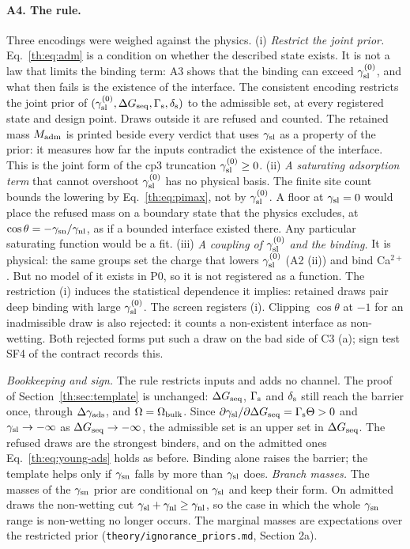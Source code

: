 \paragraph{A4. The rule.} Three encodings were weighed against the physics.
(i) \emph{Restrict the joint prior.} Eq.~\eqref{th:eq:adm} is a condition on whether the described
state exists. It is not a law that limits the binding term: A3 shows that the binding can exceed
$\gamma_\mathrm{sl}^{(0)}$, and what then fails is the existence of the interface. The consistent encoding restricts the
joint prior of $(\gamma_\mathrm{sl}^{(0)},\Delta G_\mathrm{seq},\Gamma_\mathrm{s},\delta_\mathrm{s})$ to the admissible set, at every registered state and design
point. Draws outside it are refused and counted. The retained mass $M_\mathrm{adm}$ is printed beside every
verdict that uses $\gamma_\mathrm{sl}$ as a property of the prior: it measures how far the inputs contradict the
existence of the interface. This is the joint form of the cp3 truncation $\gamma_\mathrm{sl}^{(0)}\ge0$.
(ii) \emph{A saturating adsorption term} that cannot overshoot $\gamma_\mathrm{sl}^{(0)}$ has no physical basis. The
finite site count bounds the lowering by Eq.~\eqref{th:eq:pimax}, not by $\gamma_\mathrm{sl}^{(0)}$. A floor at $\gamma_\mathrm{sl}=0$
would place the refused mass on a boundary state that the physics excludes, at
$\cos\theta=-\gamma_\mathrm{sn}/\gamma_\mathrm{nl}$, as if a bounded interface existed there. Any particular saturating function
would be a fit.
(iii) \emph{A coupling of $\gamma_\mathrm{sl}^{(0)}$ and the binding.} It is physical: the same groups set the charge that
lowers $\gamma_\mathrm{sl}^{(0)}$ (A2 (ii)) and bind Ca$^{2+}$. But no model of it exists in P0, so it is not registered
as a function. The restriction (i) induces the statistical dependence it implies: retained draws pair
deep binding with large $\gamma_\mathrm{sl}^{(0)}$.
The screen registers (i). Clipping $\cos\theta$ at $-1$ for an inadmissible draw is also rejected: it
counts a non-existent interface as non-wetting. Both rejected forms put such a draw on the bad side of
C3 (a); sign test SF4 of the contract records this.

\emph{Bookkeeping and sign.} The rule restricts inputs and adds no channel. The proof of
Section~\ref{th:sec:template} is unchanged: $\Delta G_\mathrm{seq}$, $\Gamma_\mathrm{s}$ and $\delta_\mathrm{s}$ still reach the barrier once,
through $\Delta\gamma_\mathrm{ads}$, and $\Omega=\Omega_\mathrm{bulk}$. Since $\partial\gamma_\mathrm{sl}/\partial\Delta G_\mathrm{seq}=\Gamma_\mathrm{s}\Theta>0$ and
$\gamma_\mathrm{sl}\to-\infty$ as $\Delta G_\mathrm{seq}\to-\infty$, the admissible set is an upper set in $\Delta G_\mathrm{seq}$. The refused
draws are the strongest binders, and on the admitted ones Eq.~\eqref{th:eq:young-ads} holds as before.
Binding alone raises the barrier; the template helps only if $\gamma_\mathrm{sn}$ falls by more than $\gamma_\mathrm{sl}$ does.
\emph{Branch masses.} The masses of the $\gamma_\mathrm{sn}$ prior are conditional on $\gamma_\mathrm{sl}$ and keep their form.
On admitted draws the non-wetting cut $\gamma_\mathrm{sl}+\gamma_\mathrm{nl}\ge\gamma_\mathrm{nl}$, so the case in which the whole $\gamma_\mathrm{sn}$ range is
non-wetting no longer occurs. The marginal masses are expectations over the restricted prior
(\texttt{theory/ignorance\_priors.md}, Section 2a).

